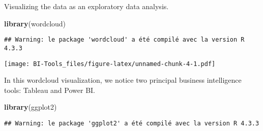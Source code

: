 \documentclass[
]{article}
\newenvironment{Shaded}{\begin{snugshade}}{\end{snugshade}}
\newcommand{\AttributeTok}[1]{\textcolor[rgb]{0.13,0.29,0.53}{#1}}
\newcommand{\ConstantTok}[1]{\textcolor[rgb]{0.56,0.35,0.01}{#1}}
\newcommand{\DecValTok}[1]{\textcolor[rgb]{0.00,0.00,0.81}{#1}}
\newcommand{\FloatTok}[1]{\textcolor[rgb]{0.00,0.00,0.81}{#1}}
\newcommand{\FunctionTok}[1]{\textcolor[rgb]{0.13,0.29,0.53}{\textbf{#1}}}
\newcommand{\NormalTok}[1]{#1}
\newcommand{\SpecialCharTok}[1]{\textcolor[rgb]{0.81,0.36,0.00}{\textbf{#1}}}
\newcommand{\StringTok}[1]{\textcolor[rgb]{0.31,0.60,0.02}{#1}}
\begin{document}
Visualizing the data as an exploratory data analysis.

\begin{Shaded}
\begin{Highlighting}[]
\FunctionTok{library}\NormalTok{(wordcloud)}
\end{Highlighting}
\end{Shaded}

\begin{verbatim}
## Warning: le package 'wordcloud' a été compilé avec la version R 4.3.3
\end{verbatim}

\begin{Shaded}
\end{Shaded}

\texttt{[image: BI-Tools\_files/figure-latex/unnamed-chunk-4-1.pdf]}

In this wordcloud visualization, we notice two principal business
intelligence tools: Tableau and Power BI.

\begin{Shaded}
\begin{Highlighting}[]
\FunctionTok{library}\NormalTok{(ggplot2)}
\end{Highlighting}
\end{Shaded}

\begin{verbatim}
## Warning: le package 'ggplot2' a été compilé avec la version R 4.3.3
\end{verbatim}
\end{document}
